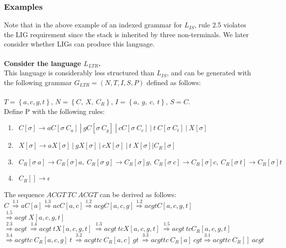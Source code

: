 \documentclass[11pt]{article}
\begin{document}
\subsubsection {Examples}
Note that in the above example of an indexed grammar for $L_{IS}$, rule 2.5 violates the LIG requirement since the stack is inherited by three non-terminals.
We later consider whether LIGs can produce this language.\\ \\
{\bf Consider the language $L_{LTR}$.}\\
This language is considerably less structured than $L_{IS}$, and can be generated with the following grammar $G_{LTR} 
 = (N, T, I, S, P)$ defined as follows: \\ \\
$T = \left\{a,c,g,t\right\}$, $N = \left\{C, \ X, \ C_R\right\}$, $I = \left\{a, \ g, \ c, \ t\right\}$,
$S = C$. \\
Define P with the following rules:
\begin{enumerate}
\item $\ \ C[\sigma] \rightarrow a C[\sigma \ C_a] \ | \ g C[\sigma \ C_g] \ | \ c C[\sigma \ C_c] \ | \ t \ C[\sigma \ C_t] \ | \ X[\sigma]$
\item $\ \ X[\sigma] \rightarrow a X[\sigma] \ | \ g X[\sigma] \ | \ c X[\sigma] \ | \ t \ X[\sigma] | C_R[\sigma]$
\item $\ \ C_R[\sigma \ a] \rightarrow C_R[\sigma] a, \ C_R[\sigma \ g] \rightarrow C_R[\sigma] g, \ C_R[\sigma \ c] \rightarrow C_R[\sigma] c, \ C_R[\sigma \ t] \rightarrow C_R[\sigma] t$
\item $\ \ C_R[] \rightarrow \epsilon$
\end{enumerate}
The sequence $ACGT \ TC \ ACGT$ can be derived as follows:\\
\indent$ C \ \overset{1.1}{\Rightarrow} a C[a] \overset{1.3}{\Rightarrow} ac C[a, c] \overset{1.2}{\Rightarrow} acg C[a, c, g] \overset{1.2}{\Rightarrow} acgt C[a, c, g, t] $ \\
\indent\indent$            \overset{1.5}{\Rightarrow} acgt \ X[a, c, g, t]$ \\
\indent\indent$            \overset{2.3}{\Rightarrow} acgt \ \overset{1.4}{\Rightarrow} acgt \ t X[a, c, g, t] \ \overset{1.3}{\Rightarrow} acgt \ tc X[a, c, g, t] \ \overset{1.5}{\Rightarrow} acgt \ tc C_R[a, c, g, t]$ \\
\indent\indent$            \overset{3.4}{\Rightarrow} acgttc \ C_R[a, c, g] \ t \ \overset{3.2}{\Rightarrow} acgttc \ C_R[a, c] \ gt \ \overset{3.3}{\Rightarrow} acgttc \ C_R[a] \ cgt \overset{3.1}{\Rightarrow} acgttc \ C_R[] \ acgt$ \\
\end{document}
